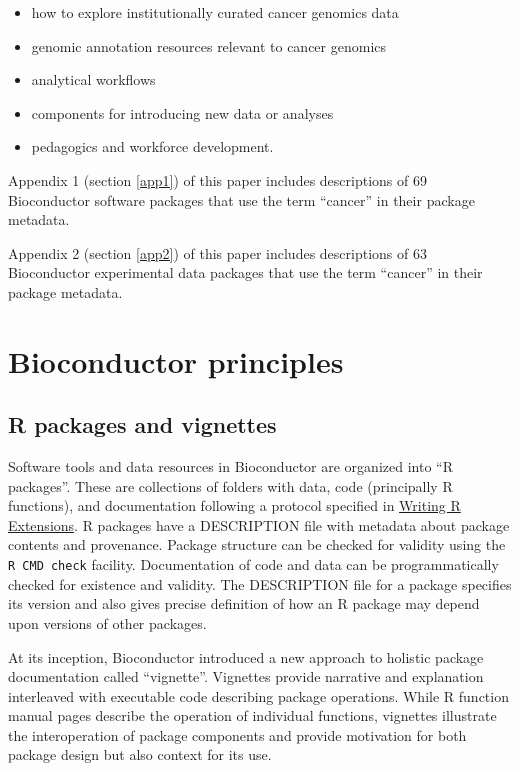 \documentclass[]{article}
\providecommand{\tightlist}{%
  \setlength{\itemsep}{0pt}\setlength{\parskip}{0pt}}
\begin{document}
\begin{itemize}
\tightlist
\item
  how to explore institutionally curated cancer genomics data
\item
  genomic annotation resources relevant to cancer genomics
\item
  analytical workflows
\item
  components for introducing new data or analyses
\item
  pedagogics and workforce development.
\end{itemize}

Appendix 1 (section \ref{app1}) of this paper includes descriptions of 69
Bioconductor software packages that use the term ``cancer'' in their package metadata.

Appendix 2 (section \ref{app2}) of this paper includes descriptions of 63
Bioconductor experimental data packages that use the term ``cancer'' in their package metadata.

\hypertarget{bioconductor-principles}{%
\section{Bioconductor principles}\label{bioconductor-principles}}

\hypertarget{r-packages-and-vignettes}{%
\subsection{R packages and vignettes}\label{r-packages-and-vignettes}}

Software tools and data resources in Bioconductor are organized
into ``R packages''. These are collections of folders with data,
code (principally R functions), and documentation
following a protocol specified in
\href{https://cran.r-project.org/doc/manuals/R-exts.html}{Writing R Extensions}. R packages have a DESCRIPTION file with metadata about
package contents and provenance. Package structure can be
checked for validity using the \texttt{R CMD check} facility.
Documentation of code and data can be programmatically
checked for existence and validity. The DESCRIPTION file
for a package specifies its version and
also gives precise definition of how an R package may
depend upon versions of other packages.

At its inception,
Bioconductor introduced a new approach to holistic package
documentation called ``vignette''.
Vignettes provide narrative and explanation interleaved with
executable code describing package operations.
While R function manual pages describe
the operation of individual functions,
vignettes illustrate the interoperation
of package components and provide motivation
for both package design but also context
for its use.
\end{document}
